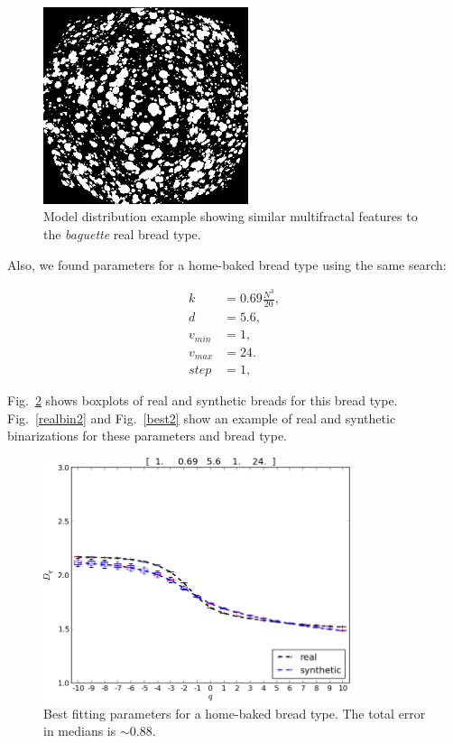 \documentclass[spanish,a4paper,11pt,oneside,links]{report}
\begin{document}
\begin{figure}[!ht]
\begin{center}
\includegraphics[width=6cm]{figures/best}
\caption{Model distribution example showing similar multifractal features to the {\em baguette} real bread type.}
\label{best}
\end{center}
\end{figure}

Also, we found parameters for a home-baked bread type using the same search:

\begin{align*}
k &= 0.69 \frac{N^{3}}{20} ,\\
d &=5.6,\\
v_{min} &=1,\\
v_{max} &=24.\\
step &=1,
\end{align*}

Fig.~\ref{bestboxplot2} shows boxplots of real and synthetic breads for this bread type. Fig.~\ref{realbin2} and  Fig.~\ref{best2} show an example of real and synthetic binarizations for these parameters and bread type. 


\begin{figure}[!ht]
\includegraphics[width=9cm]{figures/bestboxplot2}
\caption{Best fitting parameters for a home-baked bread type. The total error in medians is $\sim 0.88$.}
\label{bestboxplot2}
\end{figure}
\end{document}
